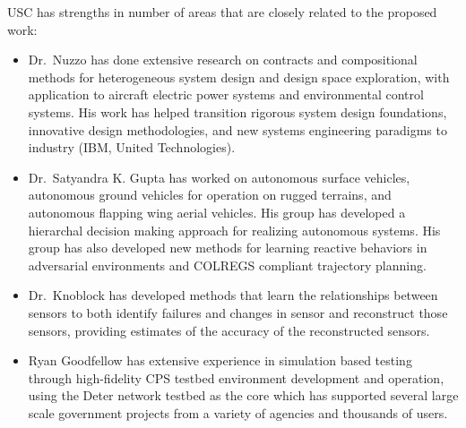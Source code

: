 \documentclass[12pt]{dod-blank}
\begin{document}
USC has strengths in number of areas that are closely related to the proposed work:
\begin{itemize}[itemsep=0pt,leftmargin=*]
\item Dr.\ Nuzzo 
has done extensive research on contracts and compositional methods for heterogeneous system design and design space exploration, with application to aircraft electric power systems and environmental control systems. His work has helped transition rigorous system design foundations, innovative design methodologies, and new systems engineering paradigms to industry (IBM, United Technologies). 
\item Dr.\ Satyandra K. Gupta has worked on autonomous surface vehicles, autonomous ground vehicles for operation on rugged terrains, and autonomous flapping wing aerial vehicles.   His group has developed a hierarchal decision making approach for realizing autonomous systems. 
His group has also developed new methods for learning reactive behaviors in adversarial environments and COLREGS compliant trajectory planning. \item Dr.\ Knoblock has developed methods that learn the relationships between sensors to both identify failures and changes in sensor and reconstruct those sensors, providing estimates of the accuracy of the reconstructed sensors.  
\item Ryan Goodfellow has extensive experience in simulation based testing through high-fidelity CPS testbed environment development and operation, using the Deter network testbed as the core which has supported several large scale government projects from a variety of agencies and thousands of users. %

\end{itemize}
\end{document}

